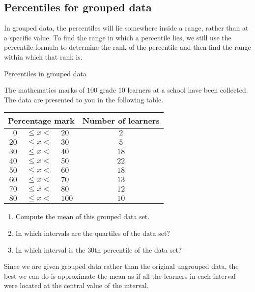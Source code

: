 \subsection{Percentiles for grouped data}

In grouped data, the percentiles will lie somewhere inside a range,
rather than at a specific value. To find the range in which a
percentile lies, we still use the percentile formula to determine the
rank of the percentile and then find the range within which that rank
is.

\begin{wex}{Percentiles in grouped data}{
    The mathematics marks of $100$ grade $10$ learners at a school have
    been collected. The data are presented to you in the following
    table.
    \begin{center}
      \begin{tabular}{r@{\ }c@{\ }lc}
        \toprule
        \multicolumn{3}{c}{Percentage mark} & Number of learners \\
        \midrule
         $0$ & $ \le x < $ &  $20$ &  $2$ \\
        $20$ & $ \le x < $ &  $30$ &  $5$ \\
        $30$ & $ \le x < $ &  $40$ & $18$ \\
        $40$ & $ \le x < $ &  $50$ & $22$ \\
        $50$ & $ \le x < $ &  $60$ & $18$ \\
        $60$ & $ \le x < $ &  $70$ & $13$ \\
        $70$ & $ \le x < $ &  $80$ & $12$ \\
        $80$ & $ \le x < $ & $100$ & $10$ \\
        \bottomrule
      \end{tabular}
    \end{center}

    \begin{enumerate}
    \item Compute the mean of this grouped data set.
    \item In which intervals are the quartiles of the data set?
    \item In which interval is the $30$th percentile of the data set?
    \end{enumerate}
}{


  Since we are given grouped data rather than the original ungrouped
  data, the best we can do is approximate the mean as if all the
  learners in each interval were located at the central value of the
  interval.

}
\end{wex}
